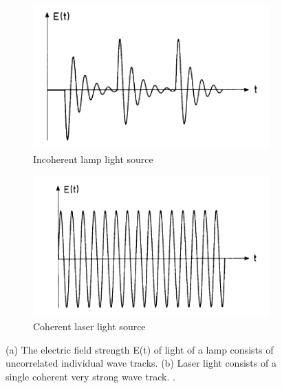 \documentclass[12pt]{article}
\begin{document}
\begin{figure}[H]
    \centering
    \begin{subfigure}[b]{.45\textwidth}
        \centering
        \includegraphics[width=\linewidth]{incoherent source.png}
        \caption{\centering Incoherent lamp light source}
        \label{fig:5a}
    \end{subfigure}
    \hspace{-.5em}
    \begin{subfigure}[b]{.45\textwidth}
        \centering
        \includegraphics[width=\linewidth]{coherent source.png}
        \caption{\centering Coherent laser light source}
        \label{fig:5b}
    \end{subfigure}
    \caption{(a) The electric field strength E(t) of light of a lamp consists of uncorrelated individual wave tracks.
    (b) Laser light consists of a single coherent very strong wave track. \protect\cite{haken1986laser}.}
    \label{fig:5}
\end{figure}
\end{document}

